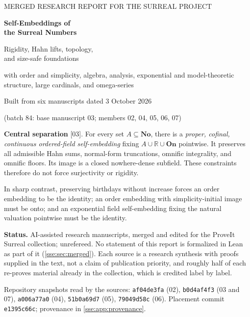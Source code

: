\documentclass[11pt,a4paper]{article}
\numberwithin{equation}{section}
\theoremstyle{plain}
\theoremstyle{definition}
\theoremstyle{remark}
\newcommand{\No}{\mathbf{No}}
\newcommand{\On}{\mathbf{On}}
\newcommand{\R}{\mathbb{R}}
\newcommand{\code}[1]{\texttt{\small #1}}
\newcommand{\src}[1]{\textup{\textsf{\small[#1]}}}%
\begin{document}
\hypersetup{pageanchor=false}
\begin{titlepage}
\vspace*{6mm}
{\color{accent}\large MERGED RESEARCH REPORT FOR THE SURREAL PROJECT}\par
\vspace{7mm}
{\color{ink}\Huge\bfseries Self-Embeddings of\\[3mm] the Surreal Numbers}\par
\vspace{7mm}
{\LARGE Rigidity, Hahn lifts, topology,\\and size-safe foundations}\par
\vspace{4mm}
{\large with order and simplicity, algebra, analysis, exponential and
model-theoretic structure, large cardinals, and omega-series}\par
\vspace{8mm}
{\large Built from six manuscripts dated 3 October 2026\par
(batch 84: base manuscript 03; members 02, 04, 05, 06, 07)}\par
\vspace{8mm}
\begin{overview}
\textbf{Central separation} \src{03}. For every set $A\subseteq\No$, there is a
\emph{proper, cofinal, continuous ordered-field self-embedding} fixing
$A\cup\R\cup\On$ pointwise. It preserves all admissible Hahn sums,
normal-form truncations, omnific integrality, and omnific floors. Its image
is a closed nowhere-dense subfield. These constraints therefore do not
force surjectivity or rigidity.

In sharp contrast, preserving birthdays without increase forces an order
embedding to be the identity; an order embedding with simplicity-initial
image must be onto; and an exponential field self-embedding fixing the
natural valuation pointwise must be the identity.
\end{overview}
\vfill
\noindent\textbf{Status.} AI-assisted research manuscripts, merged and
edited for the ProveIt Surreal collection; unrefereed. No statement of this
report is formalized in Lean as part of it (\cref{sse:sec:merged}). Each source
is a research synthesis with proofs supplied in the text, not a claim of
publication priority, and roughly half of each re-proves material already in
the collection, which is credited label by label.\par
\medskip
\noindent\small Repository snapshots read by the sources:
\code{af04de3fa} (02), \code{b0d4af4f3} (03 and 07), \code{a006a77a0} (04),
\code{51b0a69d7} (05), \code{79049d58c} (06). Placement commit
\code{e1395c66c}; provenance in \cref{sse:app:provenance}.
\end{titlepage}
\hypersetup{pageanchor=true}
\end{document}
